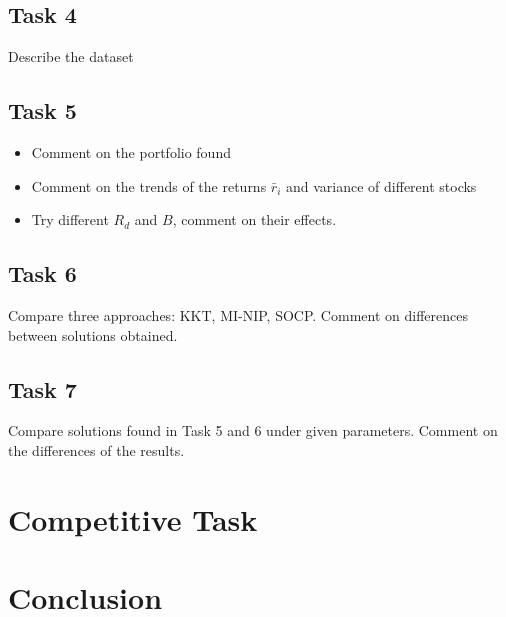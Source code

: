 \documentclass[12pt]{ftec2101}
\begin{document}
\subsection{Task 4}
Describe the dataset
\subsection{Task 5}
\begin{itemize}
    \item Comment on the portfolio found
    \item Comment on the trends of the returns $\bar{r}_i$ and variance of different stocks
    \item Try different $R_d$ and $B$, comment on their effects.
\end{itemize}
\subsection{Task 6}
Compare three approaches: KKT, MI-NIP, SOCP. Comment on differences between solutions obtained.
\subsection{Task 7}
Compare solutions found in Task 5 and 6 under given parameters. Comment on the differences of the results.
\section{Competitive Task}

\section{Conclusion}

 
\end{document}

